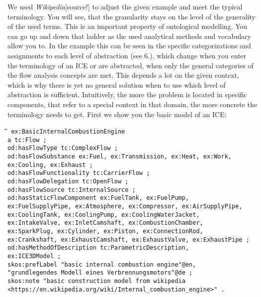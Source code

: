 \documentclass[a4paper,11pt]{article}
\newenvironment{code}{\tt \begin{tabbing}
\hskip12pt\=\hskip12pt\=\hskip12pt\=\hskip12pt\=\hskip5cm\=\hskip5cm\=\kill}
{\end{tabbing}}
\begin{document}
\begin{itemize}
    We used \emph{Wikipedia}[source!] to adjust the given example and meet the
    typical terminology. You will see, that the granularity stays on the level
    of the generality of the used terms. This is an important property of 
    ontological modelling. You can go up and down that ladder as the used
    analytical methods and vocabulary allow you to. In the example this can be
    seen in the specific categorizations and assignments to each level of 
    abstraction (see 6.), which change when you enter the terminology of
    an ICE or are abstracted, when only the general categories of the 
    flow analysis concepts are met. This depends a lot on the given context,
    which is why there is yet no general solution when to use which level of 
    abstraction is sufficient. Intuitively, the more the problem is located
    in specific components, that refer to a special context in that domain,
    the more concrete the terminology needs to get.
    \newpage
    First we show you the basic model of an ICE:
    \begin{code}\tt
        ex:BasicInternalCombustionEngine \\
        \> a tc:Flow ; \\
        \> od:hasFlowType tc:ComplexFlow ; \\
        \> od:hasFlowSubstance ex:Fuel, ex:Transmission, ex:Heat, ex:Work, \\
        \> ex:Cooling, ex:Exhaust ; \\
        \> od:hasFlowFunctionality tc:CarrierFlow ; \\
        \> od:hasFlowDelegation tc:OpenFlow ; \\
        \> od:hasFlowSource tc:InternalSource ; \\
        \> od:hasStaticFlowComponent ex:FuelTank, ex:FuelPump, \\
        \> ex:FuelSupplyPipe, ex:Atmosphere, ex:Compressor, ex:AirSupplyPipe,\\
        \> ex:CoolingTank, ex:CoolingPump, ex:CoolingWaterJacket, \\
        \> ex:IntakeValve, ex:InletCamshaft, ex:CombustionChamber, \\
        \> ex:SparkPlug, ex:Cylinder, ex:Piston, ex:ConnectionRod, \\
        \> ex:Crankshaft, ex:ExhaustCamshaft, ex:ExhaustValve, 
        \> ex:ExhaustPipe ; \\
        \> od:hasMethodOfDescription tc:ParametricDescription, \\
        \> ex:ICE3DModel ; \\
        \> skos:prefLabel "basic internal combustion engine"@en, \\
        \> "grundlegendes Modell eines Verbrennungsmotors"@de  ; \\
        \> skos:note "basic construction model from wikipedia \\
        \> <https://en.wikipedia.org/wiki/Internal\_combustion\_engine>" . \\
    \end{code}


\end{itemize}
\end{document}
